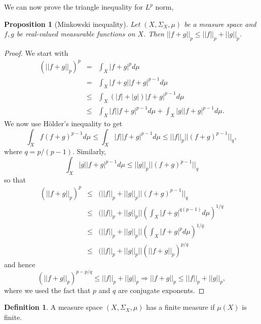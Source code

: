 \documentclass{article}
\theoremstyle{plain}
\numberwithin{thm}{section}
\theoremstyle{plain}
\newtheorem{prop}{Proposition}
\numberwithin{prop}{section}
\theoremstyle{definition}
\newtheorem{defn}{Definition}
\numberwithin{defn}{section}
\theoremstyle{remark}
\theoremstyle{plain}
\numberwithin{cor}{section}
\numberwithin{equation}{section}
\begin{document}
We can now prove the triangle inequality for $L^p$ norm,
\begin{prop}[Minkowski inequality]\label{s5p4}
Let $(X, \Sigma_X, \mu)$ be a measure space and $f, g$ be real-valued
measurable functions on $X$. Then $||f + g||_p \le ||f||_p + ||g||_p$.
\end{prop}
\begin{proof}
We start with
\begin{eqnarray*}
(||f + g||_p)^p &=& \int_X |f + g|^p d\mu \\
 &=& \int_X |f + g||f + g|^{p-1} d\mu \\
 &\le& \int_X (|f| + |g|)|f + g|^{p-1} d\mu \\
 &\le& \int_X |f||f + g|^{p-1} d\mu + \int_X |g||f + g|^{p-1} d\mu.
\end{eqnarray*}
We now use H\"{o}lder's inequality to get
\[
\int_X f(f+g)^{p-1} d\mu \le \int_X |f||f + g|^{p-1} d\mu 
\le ||f||_p||(f + g)^{p-1}||_q,
\]
where $q = p/(p - 1)$.
Similarly,
\[
\int_X |g||f + g|^{p-1} d\mu \le ||g||_p||(f + g)^{p-1}||_q
\]
so that
\begin{eqnarray*}
(||f + g||_p)^p &\le& (|| f ||_p + || g ||_p||(f + g)^{p-1}||_q \\
 &\le& (||f||_p + ||g||_p||\left(\int_X |f + g|^{q(p-1)}d\mu\right)^{1/q} \\
 &\le& (||f||_p + ||g||_p||\left(\int_X |f + g|^{p}d\mu\right)^{1/q} \\
 &\le& (||f||_p + ||g||_p||\left(||f + g||_p\right)^{p/q}
\end{eqnarray*}
and hence
\[
(||f + g||_p)^{p - p/q} \le ||f||_p + ||g||_p \Rightarrow 
||f + g||_p \le ||f||_p + ||g||_p,
\]
where we used the fact that $p$ and $q$ are conjugate exponents.
\end{proof}

\begin{defn}\label{s5d5}
A measure space $(X, \Sigma_X, \mu)$ has a finite measure if $\mu(X)$ is finite.
\end{defn}
\end{document}
